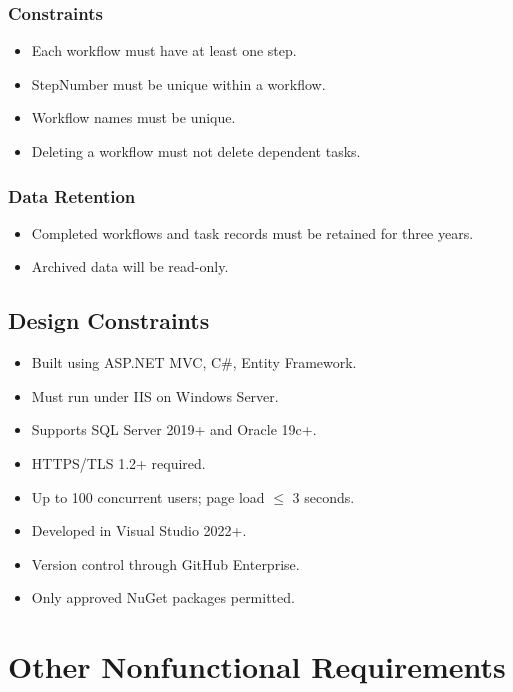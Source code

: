 \documentclass[12pt]{article}
\begin{document}
\subsubsection{Constraints}
\begin{itemize}
    \item Each workflow must have at least one step.
    \item StepNumber must be unique within a workflow.
    \item Workflow names must be unique.
    \item Deleting a workflow must not delete dependent tasks.
\end{itemize}

\subsubsection{Data Retention}
\begin{itemize}
    \item Completed workflows and task records must be retained for three years.
    \item Archived data will be read-only.
\end{itemize}

\subsection{Design Constraints}
\begin{itemize}
    \item Built using ASP.NET MVC, C\#, Entity Framework.
    \item Must run under IIS on Windows Server.
    \item Supports SQL Server 2019+ and Oracle 19c+.
    \item HTTPS/TLS 1.2+ required.
    \item Up to 100 concurrent users; page load $\leq$ 3 seconds.
    \item Developed in Visual Studio 2022+.
    \item Version control through GitHub Enterprise.
    \item Only approved NuGet packages permitted.
\end{itemize}

\section{Other Nonfunctional Requirements}
\end{document}
